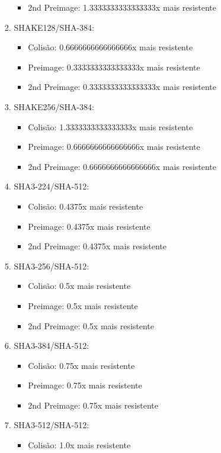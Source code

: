 \documentclass[12pt, a4paper]{article}
\begin{document}
\begin{enumerate}
\begin{enumerate}
\begin{enumerate}
\begin{itemize}
 \item 2nd Preimage: 1.3333333333333333x mais resistente
 \end{itemize}
\item SHAKE128/SHA-384:
 \begin{itemize}
 \item Colisão: 0.6666666666666666x mais resistente

 \item Preimage: 0.3333333333333333x mais resistente

 \item 2nd Preimage: 0.3333333333333333x mais resistente
 \end{itemize}
\item SHAKE256/SHA-384:
 \begin{itemize}
 \item Colisão: 1.3333333333333333x mais resistente

 \item Preimage: 0.6666666666666666x mais resistente

 \item 2nd Preimage: 0.6666666666666666x mais resistente
 \end{itemize}
\item SHA3-224/SHA-512:
 \begin{itemize}
 \item Colisão: 0.4375x mais resistente

 \item Preimage: 0.4375x mais resistente

 \item 2nd Preimage: 0.4375x mais resistente
 \end{itemize}
\item SHA3-256/SHA-512:
 \begin{itemize}
 \item Colisão: 0.5x mais resistente

 \item Preimage: 0.5x mais resistente

 \item 2nd Preimage: 0.5x mais resistente
 \end{itemize}
\item SHA3-384/SHA-512:
 \begin{itemize}
 \item Colisão: 0.75x mais resistente

 \item Preimage: 0.75x mais resistente

 \item 2nd Preimage: 0.75x mais resistente
 \end{itemize}
\item SHA3-512/SHA-512:
 \begin{itemize}
 \item Colisão: 1.0x mais resistente


\end{itemize}
\end{enumerate}
\end{enumerate}
\end{enumerate}
\end{document}
